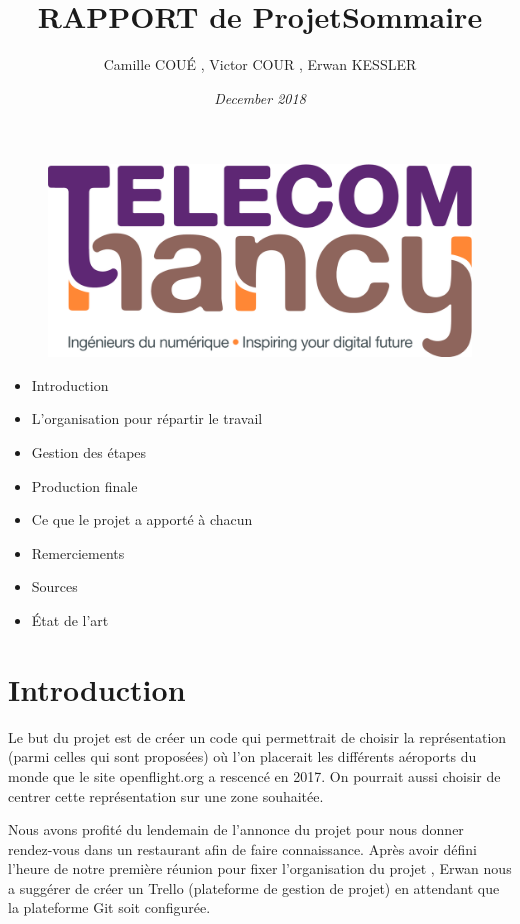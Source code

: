 \documentclass{article}
\begin{document}
\begin{figure}
\centering
\includegraphics[scale=0.1]{logo_TNCY.png}
\label{fig:logo_tncy}
\end{figure}

\title{\bf RAPPORT de Projet}
\author{ Camille COUÉ , Victor COUR , Erwan KESSLER}
\date{\it December 2018}

\maketitle


\title{\bf \Large Sommaire}
\begin{itemize}
    \item Introduction
    \item L'organisation pour répartir le travail 
    \item Gestion des étapes
    \item Production finale
    \item Ce que le projet a apporté à chacun
    \item Remerciements
    \item Sources
    \item État de l'art
\end{itemize}
\section { Introduction }



Le but du projet est de créer un code qui permettrait de choisir la représentation (parmi celles qui sont proposées) où l’on placerait les différents aéroports du monde que le site openflight.org a rescencé en 2017. On pourrait aussi choisir de centrer cette représentation sur une zone souhaitée.

\vspace{1\baselineskip}

Nous avons profité du lendemain de l’annonce du projet pour nous donner rendez-vous dans un restaurant afin de faire connaissance. Après avoir défini l’heure de notre première réunion pour fixer l’organisation du projet , Erwan nous a suggérer de créer un Trello (plateforme de gestion de projet) en attendant que la plateforme Git soit configurée.
\end{document}
